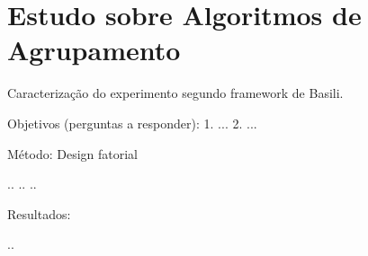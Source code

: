 
\chapter{Estudo sobre Algoritmos de Agrupamento} \label{cap:estudo}

Caracterização do experimento segundo framework de Basili.

Objetivos (perguntas a responder):
1. ...
2. ...

Método:
Design fatorial

..
..
..

Resultados:

..
 